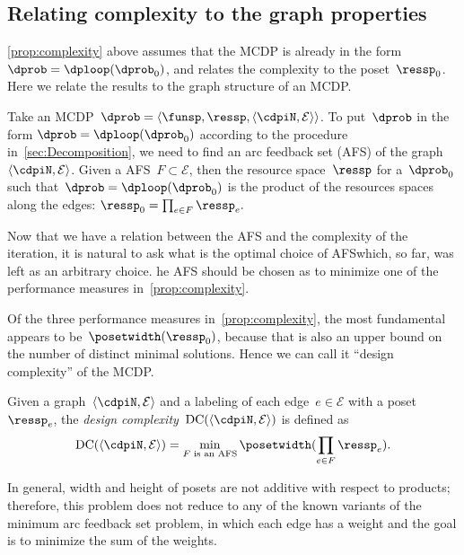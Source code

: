 \subsection{Relating complexity to the graph properties}

\cref{prop:complexity} above assumes that the MCDP is already in the form $\dprob=\dploop(\dprob_{0})$, and relates the complexity to
the poset~$\ressp_{0}$.
Here we relate the results to the graph structure of an MCDP.

Take an MCDP~$\dprob=\left\langle \funsp,\ressp,\left\langle \cdpiN,\mathcal{E}\right\rangle \right\rangle $.
To put~$\dprob$ in the form $\dprob=\dploop(\dprob_{0})$ according
to the procedure in~\cref{sec:Decomposition}, we need to find an arc
feedback set (AFS) of the graph~$\left\langle \cdpiN,\mathcal{E}\right\rangle $.
Given a AFS~$F\subset\mathcal{E}$, then the resource space~$\ressp$ for a~$\dprob_{0}$ such that~$\dprob=\dploop(\dprob_{0})$ is the product of the resources spaces along the edges: $\ressp_{0}=\prod_{e\in F}\ressp_{e}.$

Now that we have a relation between the AFS and the complexity of the iteration, it is natural to ask what is the optimal choice of
AFS\textemdash which, so far, was left as an arbitrary choice.
he AFS should be chosen as to minimize one of the performance measures in~\cref{prop:complexity}.

Of the three performance measures in~\cref{prop:complexity}, the most fundamental appears to be~$\posetwidth(\ressp_{0})$, because that is also an upper bound on the number of distinct minimal solutions.
Hence we can call it ``design complexity'' of the MCDP.
\begin{definition}
    \label{def:design-complexity}Given a graph~$\left\langle \cdpiN,\mathcal{E}\right\rangle $
    and a labeling of each edge~$e\in\mathcal{E}$ with a poset~$\ressp_{e}$,
    the \emph{design complexity~}$\text{DC}(\left\langle \cdpiN,\mathcal{E}\right\rangle )$
    is defined as
    \begin{equation}
        \text{DC}(\left\langle \cdpiN,\mathcal{E}\right\rangle )=\min_{F\text{ is an AFS}}\posetwidth(\prod_{e\in F}\ressp_{e}).\label{eq:complexity}
    \end{equation}
\end{definition}
In general, width and height of posets are not additive with respect
to products; therefore, this problem does not reduce to any of the
known variants of the minimum arc feedback set problem, in which
each edge has a weight and the goal is to minimize the sum of the
weights.

